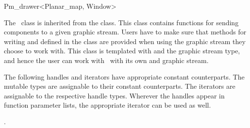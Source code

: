 
\ccRefPageBegin


\begin{ccRefClass}{Pm_drawer<Planar_map, Window>}


\ccDefinition
The \ccRefName\ class is inherited from the  class. 
This class contains functions for sending  components to a given graphic stream.
Users have to make sure that methods for writing  and  defined in  
the  class are provided when using the graphic stream they choose to work with.
This class is templated with  and the graphic stream type, and hence the user can work with \ccRefName\ with its own  and graphic stream. 
 

\ccTypes

The following handles and iterators have appropriate constant counterparts. The mutable types are assignable to their
constant counterparts. The iterators are assignable to the respective handle types. 
Wherever the handles appear in function parameter lists, the appropriate iterator can be used as well. 

.


\end{ccRefClass}

